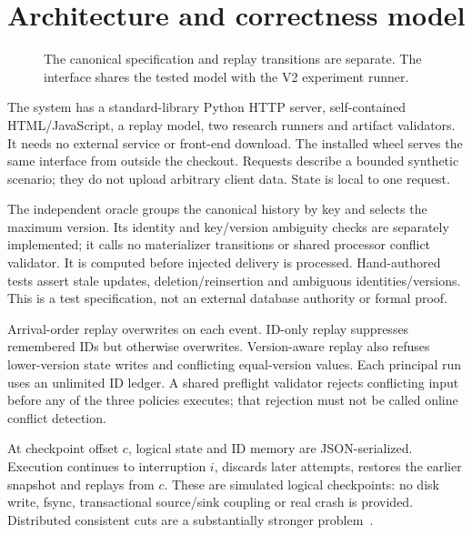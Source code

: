 \documentclass[sigconf,9pt,review]{acmart}
\begin{document}
\section{Architecture and correctness model}
\begin{figure}[t]
\centering
{}
\caption{The canonical specification and replay transitions are separate. The interface
shares the tested model with the V2 experiment runner.}
\label{fig:architecture}
\end{figure}
The system has a standard-library Python HTTP server, self-contained HTML/JavaScript,
a replay model, two research runners and artifact validators. It needs no external
service or front-end download. The installed wheel serves the same interface from
outside the checkout. Requests describe a bounded synthetic scenario; they do not
upload arbitrary client data. State is local to one request.

The independent oracle groups the canonical history by key and selects the maximum
version. Its identity and key/version ambiguity checks are separately implemented;
it calls no materializer transitions or shared processor conflict validator. It is
computed before injected delivery is processed. Hand-authored tests assert stale
updates, deletion/reinsertion and ambiguous identities/versions. This is a test
specification, not an external database authority or formal proof.

Arrival-order replay overwrites on each event. ID-only replay suppresses remembered
IDs but otherwise overwrites. Version-aware replay also refuses lower-version state
writes and conflicting equal-version values. Each principal run uses an unlimited
ID ledger. A shared preflight validator rejects conflicting input before any of the
three policies executes; that rejection must not be called online conflict detection.

At checkpoint offset $c$, logical state and ID memory are JSON-serialized. Execution
continues to interruption $i$, discards later attempts, restores the earlier snapshot
and replays from $c$. These are simulated logical checkpoints: no disk write,
fsync, transactional source/sink coupling or real crash is provided. Distributed
consistent cuts are a substantially stronger problem~\cite{snapshots}.
\end{document}
